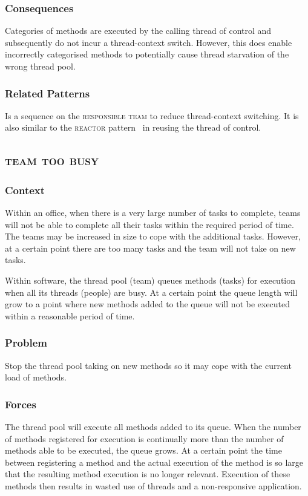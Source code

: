 \documentclass[prodmode]{style/acmlarge}
\begin{document}
\subsubsection*{Consequences} Categories of methods are executed by the calling
thread of control and subsequently do not incur a thread-context switch.
However, this does enable incorrectly categorised methods to potentially cause
thread starvation of the wrong thread pool.

\subsubsection*{Related Patterns} Is a sequence on the \textsc{responsible team}
to reduce thread-context switching.  It is also similar to the \textsc{reactor}
pattern~\cite{reactor} in reusing the thread of control.



\subsection{\textsc{\textbf{team too busy}}}

\subsubsection*{Context} Within an office, when there is a very large number of
tasks to complete, teams will not be able to complete all their tasks within the
required period of time.  The teams may be increased in size to cope with the
additional tasks.  However, at a certain point there are too many tasks and the
team will not take on new tasks.

Within software, the thread pool (team) queues methods (tasks) for execution
when all its threads (people) are busy.  At a certain point the queue length
will grow to a point where new methods added to the queue will not be executed
within a reasonable period of time.

\subsubsection*{\textbf{Problem}} Stop the thread pool taking on new methods so
it may cope with the current load of methods.

\subsubsection*{Forces} The thread pool will execute all methods added to its
queue.  When the number of methods registered for execution is continually more
than the number of methods able to be executed, the queue grows.  At a certain
point the time between registering a method and the actual execution of the
method is so large that the resulting method execution is no longer relevant. 
Execution of these methods then results in wasted use of threads and a
non-responsive application.
\end{document}
